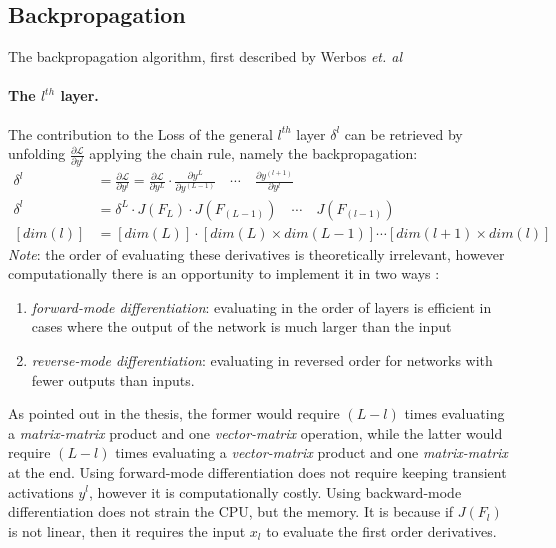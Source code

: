 \subsection{Backpropagation}
The backpropagation algorithm, first described by Werbos \emph{et. al} \cite{werbos1994roots}
\paragraph{The $l^{th}$ layer.} 
The contribution to the Loss of the general $l^{th}$ layer $\delta^l$ can be retrieved by unfolding $\frac{\partial \mathcal{L}}{\partial y^l}$ applying the chain rule, namely the backpropagation:
\begin{equation}\label{backprop}
\begin{split}
    \delta^l &= 
    \frac{\partial \mathcal{L}}{\partial y^{l}} = 
    \frac{\partial \mathcal{L}}{\partial y^{L}} \cdot
    \frac{\partial y^{L}}{\partial y^{(L-1)}} \quad \cdots \quad
    \frac{\partial y^{(l+1)}}{\partial y^{l}} \\
    \delta^l &= \delta^L \cdot J(F_L) \cdot J(F_{(L-1)}) \quad \cdots \quad J(F_{(l-1)})\\
    \left[dim(l)\right] &= \left[dim(L)\right] \cdot \left[dim(L)\times dim(L-1)\right] \cdots \left[dim(l+1)\times dim(l)\right]
\end{split}   
\end{equation}
\emph{Note}: the order of evaluating these derivatives is theoretically irrelevant, 
however computationally there is an opportunity to implement it in two ways \cite{akthesis}:
\begin{enumerate}
    \item[] \emph{forward-mode differentiation}: evaluating in the order of layers is efficient in cases where the output of the network is much larger than the input
    \item[] \emph{reverse-mode differentiation}: evaluating in reversed order for networks with fewer outputs than inputs.
\end{enumerate}
As pointed out in the thesis, the former would require $(L-l)$  times evaluating a \emph{matrix-matrix} product and one \emph{vector-matrix} operation,
while the latter would require $(L-l)$ times evaluating a \emph{vector-matrix} product and one \emph{matrix-matrix} at the end. 
Using forward-mode differentiation does not require keeping transient activations $y^l$, however it is computationally costly.
Using backward-mode differentiation does not strain the CPU, but the memory. 
It is because if $J(F_l)$ is not linear, then it requires the input $x_l$ to evaluate the first order derivatives.

